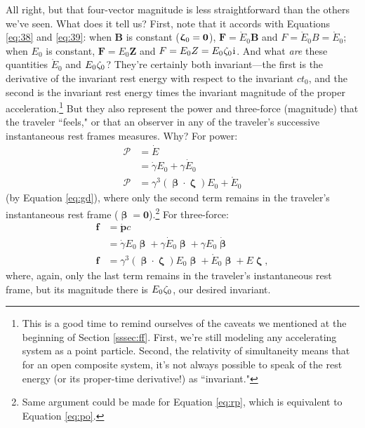 \documentclass[12pt]{article}
\renewcommand{\vv}[1]{\mathbf{#1}}
\newcommand{\vvbeta}{\bm{\upbeta}}
\newcommand{\vvzeta}{\bm{\upzeta}}
\begin{document}
All right, but that four-vector magnitude is less straightforward than the others we've seen. What does it tell us? First, note that it accords with Equations \ref{eq:38} and \ref{eq:39}: when $\vv B$ is constant ($\vvzeta_{\mkern1mu 0} = \vv 0$), $\vv F = \mathring{E}_0 \vv B$ and $F = \mathring{E}_0 B = \mathring{E}_0$; when $E_0$ is constant, $\vv F = E_0 \vv Z$ and $F = E_0 Z = E_0 \mkern.5mu \zeta_0 \mkern1mu \mathrm{i}$. And what \emph{are} these quantities $\mathring{E}_0$ and $E_0 \mkern.5mu \zeta_0$? They're certainly both invariant---the first is the derivative of the invariant rest energy with respect to the invariant $c t_0$, and the second is the invariant rest energy times the invariant magnitude of the proper acceleration.\footnote{This is a good time to remind ourselves of the caveats we mentioned at the beginning of Section \ref{sssec:ff}. First, we're still modeling any accelerating system as a point particle. Second, the relativity of simultaneity means that for an open composite system, it's not always possible to speak of the rest energy (or its proper-time derivative!) as ``invariant."} But they also represent the power and three-force (magnitude) that the traveler ``feels," or that an observer in any of the traveler's successive instantaneous rest frames measures. Why? For power:
\begin{equation}\label{eq:po}
\begin{split}
\mathcal{P} &= \dot{E}\\
&= \dot{\gamma} E_0 + \gamma \dot{E}_0\\
\mathcal{P} &= \gamma^3 (\vvbeta \cdot \vvzeta) E_0 + \mathring{E}_0
\end{split}
\end{equation}
(by Equation \ref{eq:gd}), where only the second term remains in the traveler's instantaneous rest frame ($\vvbeta = \vv 0$).\footnote{Same argument could be made for Equation \ref{eq:rp}, which is equivalent to Equation \ref{eq:po}.} For three-force:
\begin{equation}\label{eq:41}
\begin{split}
\vv f &= \dot{\vv p} c\\
&= \dot{\gamma} E_0 \vvbeta + \gamma \dot{E}_0 \vvbeta + \gamma E_0 \dot{\vvbeta}\\
\vv f &=\gamma^3 (\vvbeta \cdot \vvzeta) E_0 \vvbeta + \mathring{E}_0 \vvbeta + E \vvzeta,
\end{split}
\end{equation}
where, again, only the last term remains in the traveler's instantaneous rest frame, but its magnitude there is $E_0 \mkern.5mu \zeta_0$, our desired invariant.
\end{document}
